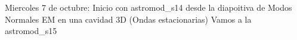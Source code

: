 Miercoles 7 de octubre:
Inicio con astromod_s14 desde la diapoitiva de Modos Normales EM en una cavidad 3D (Ondas estacionarias)
Vamos a la astromod_s15
